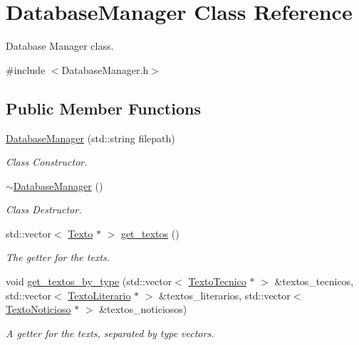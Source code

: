 \hypertarget{class_database_manager}{\section{Database\-Manager Class Reference}
\label{class_database_manager}
}


Database Manager class.  




{\ttfamily \#include $<$Database\-Manager.\-h$>$}

\subsection*{Public Member Functions}
\begin{DoxyCompactItemize}
\item 
\hyperlink{class_database_manager_a24e3c3701ce01fdac96cc170b334aeba}{Database\-Manager} (std\-::string filepath)
\begin{DoxyCompactList}\small\item\em Class Constructor. \end{DoxyCompactList}\item 
\hyperlink{class_database_manager_ae9b3a5da1e04fbb00faf8a034da1d063}{$\sim$\-Database\-Manager} ()
\begin{DoxyCompactList}\small\item\em Class Destructor. \end{DoxyCompactList}\item 
std\-::vector$<$ \hyperlink{class_texto}{Texto} $\ast$ $>$ \hyperlink{class_database_manager_a362dc9fb3beb6cd0ca9cb1d42703ec03}{get\-\_\-textos} ()
\begin{DoxyCompactList}\small\item\em The getter for the texts. \end{DoxyCompactList}\item 
void \hyperlink{class_database_manager_a3ea3390feb2069715c7af51ebb41a26c}{get\-\_\-textos\-\_\-by\-\_\-type} (std\-::vector$<$ \hyperlink{class_texto_tecnico}{Texto\-Tecnico} $\ast$ $>$ \&textos\-\_\-tecnicos, std\-::vector$<$ \hyperlink{class_texto_literario}{Texto\-Literario} $\ast$ $>$ \&textos\-\_\-literarios, std\-::vector$<$ \hyperlink{class_texto_noticioso}{Texto\-Noticioso} $\ast$ $>$ \&textos\-\_\-noticiosos)
\begin{DoxyCompactList}\small\item\em A getter for the texts, separated by type vectors. \end{DoxyCompactList}\item 

\end{DoxyCompactItemize}
